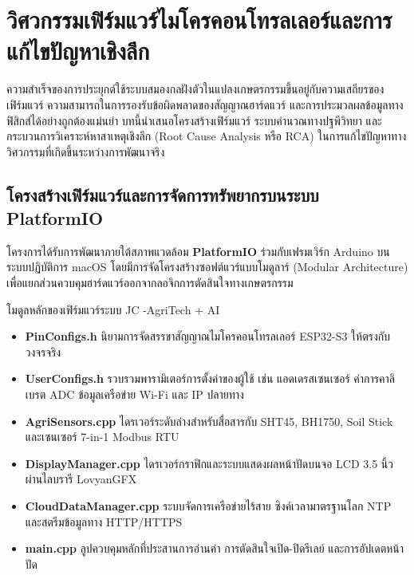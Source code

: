 \chapter{วิศวกรรมเฟิร์มแวร์ไมโครคอนโทรลเลอร์และการแก้ไขปัญหาเชิงลึก}
\label{chap:firmware}

ความสำเร็จของการประยุกต์ใช้ระบบสมองกลฝังตัวในแปลงเกษตรกรรมขึ้นอยู่กับความเสถียรของเฟิร์มแวร์ ความสามารถในการรองรับข้อผิดพลาดของสัญญาณฮาร์ดแวร์ และการประมวลผลข้อมูลทางฟิสิกส์ได้อย่างถูกต้องแม่นยำ บทนี้นำเสนอโครงสร้างเฟิร์มแวร์ ระบบคำนวณทางปฐพีวิทยา และกระบวนการวิเคราะห์หาสาเหตุเชิงลึก (Root Cause Analysis หรือ RCA) ในการแก้ไขปัญหาทางวิศวกรรมที่เกิดขึ้นระหว่างการพัฒนาจริง

\section{โครงสร้างเฟิร์มแวร์และการจัดการทรัพยากรบนระบบ PlatformIO}

โครงการได้รับการพัฒนาภายใต้สภาพแวดล้อม \textbf{PlatformIO} ร่วมกับเฟรมเวิร์ก Arduino บนระบบปฏิบัติการ macOS โดยมีการจัดโครงสร้างซอฟต์แวร์แบบโมดูลาร์ (Modular Architecture) เพื่อแยกส่วนควบคุมฮาร์ดแวร์ออกจากลอจิกการตัดสินใจทางเกษตรกรรม

\begin{agribox}{โมดูลหลักของเฟิร์มแวร์ระบบ JC -AgriTech + AI}
    \begin{itemize}
        \item \textbf{PinConfigs.h} นิยามการจัดสรรขาสัญญาณไมโครคอนโทรลเลอร์ ESP32-S3 ให้ตรงกับวงจรจริง
        \item \textbf{UserConfigs.h} รวบรวมพารามิเตอร์การตั้งค่าของผู้ใช้ เช่น แอดเดรสเซนเซอร์ ค่าการคาลิเบรต ADC ข้อมูลเครือข่าย Wi-Fi และ IP ปลายทาง
        \item \textbf{AgriSensors.cpp} ไดรเวอร์ระดับล่างสำหรับสื่อสารกับ SHT45, BH1750, Soil Stick และเซนเซอร์ 7-in-1 Modbus RTU
        \item \textbf{DisplayManager.cpp} ไดรเวอร์กราฟิกและระบบแสดงผลหน้าปัดบนจอ LCD 3.5 นิ้ว ผ่านไลบรารี LovyanGFX
        \item \textbf{CloudDataManager.cpp} ระบบจัดการเครือข่ายไร้สาย ซิงค์เวลามาตรฐานโลก NTP และสตรีมข้อมูลทาง HTTP/HTTPS
        \item \textbf{main.cpp} ลูปควบคุมหลักที่ประสานการอ่านค่า การตัดสินใจเปิด-ปิดรีเลย์ และการอัปเดตหน้าปัด
    \end{itemize}
\end{agribox}

